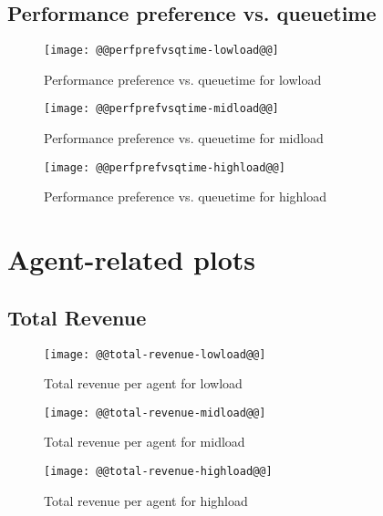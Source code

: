 \documentclass[11pt]{article}
\begin{document}
\newpage
\subsection{Performance preference vs. queuetime}
\begin{figure}[htbp]
  \begin{center}
    \texttt{[image: @@perfprefvsqtime-lowload@@]}
    \caption{Performance preference vs. queuetime for lowload}
    \label{fig:perfprefvsqtime-lowload}
  \end{center}
\end{figure}
\begin{figure}[htbp]
  \begin{center}
    \texttt{[image: @@perfprefvsqtime-midload@@]}
    \caption{Performance preference vs. queuetime for midload}
    \label{fig:perfprefvsqtime-midload}
  \end{center}
\end{figure}
\begin{figure}[htbp]
  \begin{center}
    \texttt{[image: @@perfprefvsqtime-highload@@]}
    \caption{Performance preference vs. queuetime for highload}
    \label{fig:perfprefvsqtime-highload}
  \end{center}
\end{figure}

\newpage
\section{Agent-related plots}
\subsection{Total Revenue}\label{sub:total_revenue}
\begin{figure}[htbp]
  \begin{center}
    \texttt{[image: @@total-revenue-lowload@@]}
    \caption{Total revenue per agent for lowload}
    \label{fig:total-revenue-lowload}
  \end{center}
\end{figure}
\begin{figure}[htbp]
  \begin{center}
    \texttt{[image: @@total-revenue-midload@@]}
    \caption{Total revenue per agent for midload}
    \label{fig:total-revenue-midload}
  \end{center}
\end{figure}
\begin{figure}[htbp]
  \begin{center}
    \texttt{[image: @@total-revenue-highload@@]}
    \caption{Total revenue per agent for highload}
    \label{fig:total-revenue-highload}
  \end{center}
\end{figure}
\end{document}
